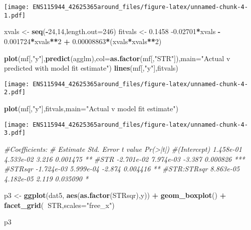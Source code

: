 \documentclass[
]{article}
\newenvironment{Shaded}{\begin{snugshade}}{\end{snugshade}}
\newcommand{\CommentTok}[1]{\textcolor[rgb]{0.56,0.35,0.01}{\textit{#1}}}
\newcommand{\DataTypeTok}[1]{\textcolor[rgb]{0.13,0.29,0.53}{#1}}
\newcommand{\DecValTok}[1]{\textcolor[rgb]{0.00,0.00,0.81}{#1}}
\newcommand{\FloatTok}[1]{\textcolor[rgb]{0.00,0.00,0.81}{#1}}
\newcommand{\KeywordTok}[1]{\textcolor[rgb]{0.13,0.29,0.53}{\textbf{#1}}}
\newcommand{\NormalTok}[1]{#1}
\newcommand{\OperatorTok}[1]{\textcolor[rgb]{0.81,0.36,0.00}{\textbf{#1}}}
\newcommand{\StringTok}[1]{\textcolor[rgb]{0.31,0.60,0.02}{#1}}
\begin{document}
\texttt{[image: ENS115944\_42625365around\_files/figure-latex/unnamed-chunk-4-1.pdf]}

\begin{Shaded}
\begin{Highlighting}[]
\NormalTok{xvals <-}\StringTok{ }\KeywordTok{seq}\NormalTok{(}\OperatorTok{-}\DecValTok{24}\NormalTok{,}\DecValTok{14}\NormalTok{,}\DataTypeTok{length.out=}\DecValTok{246}\NormalTok{)}
\NormalTok{fitvals <-}\StringTok{ }\FloatTok{0.1458} \FloatTok{-0.02701}\OperatorTok{*}\NormalTok{xvals }\OperatorTok{-}\StringTok{ }\FloatTok{0.001724}\OperatorTok{*}\NormalTok{xvals}\OperatorTok{**}\DecValTok{2} \OperatorTok{+}\StringTok{ }\FloatTok{0.00008863}\OperatorTok{*}\NormalTok{(xvals}\OperatorTok{*}\NormalTok{xvals}\OperatorTok{**}\DecValTok{2}\NormalTok{)}


\KeywordTok{plot}\NormalTok{(mf[,}\StringTok{"y"}\NormalTok{],}\KeywordTok{predict}\NormalTok{(agglm),}\DataTypeTok{col=}\KeywordTok{as.factor}\NormalTok{(mf[,}\StringTok{"STR"}\NormalTok{]),}\DataTypeTok{main=}\StringTok{"Actual v predicted with model fit estimate"}\NormalTok{)}
\KeywordTok{lines}\NormalTok{(mf[,}\StringTok{"y"}\NormalTok{],fitvals)}
\end{Highlighting}
\end{Shaded}

\texttt{[image: ENS115944\_42625365around\_files/figure-latex/unnamed-chunk-4-2.pdf]}

\begin{Shaded}
\begin{Highlighting}[]
\KeywordTok{plot}\NormalTok{(mf[,}\StringTok{"y"}\NormalTok{],fitvals,}\DataTypeTok{main=}\StringTok{"Actual v model fit estimate"}\NormalTok{)}
\end{Highlighting}
\end{Shaded}

\texttt{[image: ENS115944\_42625365around\_files/figure-latex/unnamed-chunk-4-3.pdf]}

\begin{Shaded}
\begin{Highlighting}[]
\CommentTok{#Coefficients:}
\CommentTok{#              Estimate Std. Error t value Pr(>|t|)    }
\CommentTok{#(Intercept)  1.458e-01  4.533e-02   3.216 0.001475 ** }
\CommentTok{#STR         -2.701e-02  7.974e-03  -3.387 0.000826 ***}
\CommentTok{#STRsqr      -1.724e-03  5.999e-04  -2.874 0.004416 ** }
\CommentTok{#STR:STRsqr   8.863e-05  4.182e-05   2.119 0.035090 * }


\NormalTok{p3 <-}\StringTok{ }\KeywordTok{ggplot}\NormalTok{(dat5, }\KeywordTok{aes}\NormalTok{(}\KeywordTok{as.factor}\NormalTok{(STRsqr),y)) }\OperatorTok{+}\StringTok{ }\KeywordTok{geom_boxplot}\NormalTok{() }\OperatorTok{+}\StringTok{ }\KeywordTok{facet_grid}\NormalTok{(}\OperatorTok{~}\NormalTok{STR,}\DataTypeTok{scales=}\StringTok{"free_x"}\NormalTok{)}

\NormalTok{p3}
\end{Highlighting}
\end{Shaded}
\end{document}
